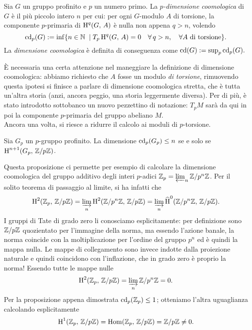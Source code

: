 \begin{definition}
	Sia $ G $ un gruppo profinito e $ p $ un numero primo. La \emph{$ p $-dimensione coomologica} di $ G $ è il più piccolo intero $ n $ per cui: per ogni $ G $-modulo $ A $ di torsione, la componente $ p $-primaria di $ \operatorname{H}^q(G, \, A) $ è nulla non appena $ q > n $, volendo
	\[ \operatorname{cd}_p(G) := \inf \{ n \in \mathbb{N} \; \mid T_p\operatorname{H}^q(G, \, A)=0\quad \forall \, q > n, \quad \forall A \text{ di torsione} \}. \]
	La \emph{dimensione coomologica} è definita di conseguenza come $ \operatorname{cd}(G) := \sup_p \operatorname{cd}_p(G). $
\end{definition}

È necessaria una certa attenzione nel maneggiare la definizione di dimensione coomologica: abbiamo richiesto che $ A $ fosse un modulo \emph{di torsione}, rimuovendo questa ipotesi si finisce a parlare di dimensione coomologica stretta, che è tutta un'altra storia (anzi, ancora peggio, una storia leggermente diversa). Per di più, è stato introdotto sottobanco un nuovo pezzettino di notazione: $ T_p M $ sarà da qui in poi la componente $ p $-primaria del gruppo abeliano $ M $. \\


Ancora una volta, si riesce a ridurre il calcolo ai moduli di $ p $-torsione.

\begin{proposition}
	Sia $ G_p $ un $ p $-gruppo profinito. La dimensione $ \operatorname{cd}_p(G_p) \leq n $ se e solo se $ \operatorname{H}^{n+1}(G_p, \, \mathbb{Z}/p\mathbb{Z}) $. \todo[dimostrare]
\end{proposition}

Questa proposizione ci permette per esempio di calcolare la dimensione coomologica del gruppo additivo degli interi $ p $-adici $ \mathbb{Z}_p = \varprojlim_n \mathbb{Z}/p^n\mathbb{Z} $. Per il solito teorema di passaggio al limite, si ha infatti che 
\[ \operatorname{H}^2(\mathbb{Z}_p , \, \mathbb{Z}/p\mathbb{Z}) = \varinjlim_n \operatorname{H}^2(\mathbb{Z}/p^n\mathbb{Z}, \, \mathbb{Z}/p\mathbb{Z}) = \varinjlim_n \operatorname{\widehat{H}}^0(\mathbb{Z}/p^n\mathbb{Z}, \, \mathbb{Z}/p\mathbb{Z}). \]
I gruppi di Tate di grado zero li conosciamo esplicitamente: per definizione sono $ \mathbb{Z}/p\mathbb{Z} $ quozientato per l'immagine della norma, ma essendo l'azione banale, la norma coincide con la moltiplicazione per l'ordine del gruppo $ p^n $ ed è quindi la mappa nulla. Le mappe di collegamento sono invece indotte dalla proiezione naturale e quindi coincidono con l'inflazione, che in grado zero è proprio la norma! Essendo tutte le mappe nulle
\[ \operatorname{H}^2(\mathbb{Z}_p , \, \mathbb{Z}/p\mathbb{Z}) = \varinjlim_n \mathbb{Z}/p^n\mathbb{Z} = 0. \]
Per la proposizione appena dimostrata $ \operatorname{cd}_p(\mathbb{Z}_p) \leq 1 $; otteniamo l'altra uguaglianza calcolando esplicitamente $$  \operatorname{H}^1(\mathbb{Z}_p , \, \mathbb{Z}/p\mathbb{Z}) = \operatorname{Hom}(\mathbb{Z}_p , \, \mathbb{Z}/p\mathbb{Z}) = \mathbb{Z}/p\mathbb{Z} \neq 0.  $$

